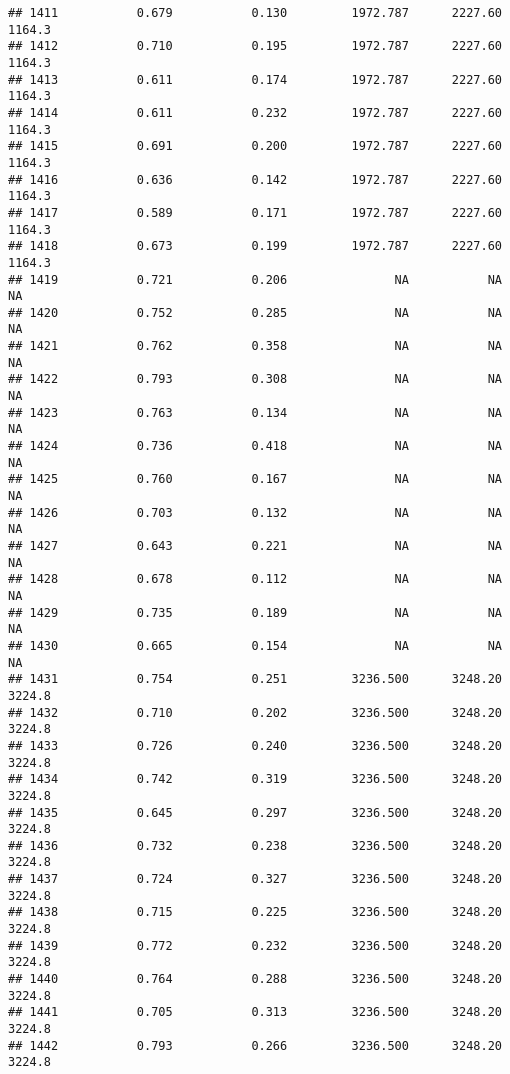 \documentclass[
]{article}
\begin{document}
\begin{verbatim}
## 1411           0.679           0.130         1972.787      2227.60       1164.3
## 1412           0.710           0.195         1972.787      2227.60       1164.3
## 1413           0.611           0.174         1972.787      2227.60       1164.3
## 1414           0.611           0.232         1972.787      2227.60       1164.3
## 1415           0.691           0.200         1972.787      2227.60       1164.3
## 1416           0.636           0.142         1972.787      2227.60       1164.3
## 1417           0.589           0.171         1972.787      2227.60       1164.3
## 1418           0.673           0.199         1972.787      2227.60       1164.3
## 1419           0.721           0.206               NA           NA           NA
## 1420           0.752           0.285               NA           NA           NA
## 1421           0.762           0.358               NA           NA           NA
## 1422           0.793           0.308               NA           NA           NA
## 1423           0.763           0.134               NA           NA           NA
## 1424           0.736           0.418               NA           NA           NA
## 1425           0.760           0.167               NA           NA           NA
## 1426           0.703           0.132               NA           NA           NA
## 1427           0.643           0.221               NA           NA           NA
## 1428           0.678           0.112               NA           NA           NA
## 1429           0.735           0.189               NA           NA           NA
## 1430           0.665           0.154               NA           NA           NA
## 1431           0.754           0.251         3236.500      3248.20       3224.8
## 1432           0.710           0.202         3236.500      3248.20       3224.8
## 1433           0.726           0.240         3236.500      3248.20       3224.8
## 1434           0.742           0.319         3236.500      3248.20       3224.8
## 1435           0.645           0.297         3236.500      3248.20       3224.8
## 1436           0.732           0.238         3236.500      3248.20       3224.8
## 1437           0.724           0.327         3236.500      3248.20       3224.8
## 1438           0.715           0.225         3236.500      3248.20       3224.8
## 1439           0.772           0.232         3236.500      3248.20       3224.8
## 1440           0.764           0.288         3236.500      3248.20       3224.8
## 1441           0.705           0.313         3236.500      3248.20       3224.8
## 1442           0.793           0.266         3236.500      3248.20       3224.8

\end{verbatim}
\end{document}
